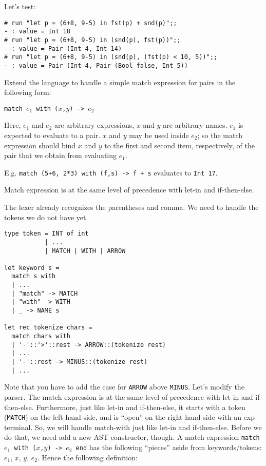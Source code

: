 \documentclass[addpoints]{exam}
\begin{document}
\begin{questions}
\begin{solution}
    
    Let's test:
    \begin{verbatim}
# run "let p = (6+8, 9-5) in fst(p) + snd(p)";;
- : value = Int 18
# run "let p = (6+8, 9-5) in (snd(p), fst(p))";;
- : value = Pair (Int 4, Int 14)
# run "let p = (6+8, 9-5) in (snd(p), (fst(p) < 10, 5))";;
- : value = Pair (Int 4, Pair (Bool false, Int 5))
    \end{verbatim}
  \end{solution}

  
  \question
  Extend the language to handle
  a simple match expression for pairs in the following form:

  \texttt{match $e_1$ with ($x$,$y$) -> $e_2$}

  Here, $e_1$ and $e_2$ are arbitrary expressions,
  $x$ and $y$ are arbitrary names.
  $e_1$ is expected to evaluate to a pair.
  $x$ and $y$ may be used
  inside $e_2$; so the match expression should bind
  $x$ and $y$ to the first and second item, respectively,
  of the pair that we obtain from evaluating $e_1$.

  E.g. \texttt{match (5+6, 2*3) with (f,s) -> f + s}
  evaluates to \texttt{Int 17}.

  Match expression is at the same level of precedence with let-in
  and if-then-else.
  
  \begin{solution}
    The lexer already recognizes the parentheses and comma.
    We need to handle the tokens we do not have yet.

    \begin{verbatim}
type token = INT of int
           | ...
           | MATCH | WITH | ARROW

let keyword s =
  match s with
  | ...
  | "match" -> MATCH
  | "with" -> WITH
  | _ -> NAME s
  
let rec tokenize chars =
  match chars with
  | '-'::'>'::rest -> ARROW::(tokenize rest)
  | ...
  | '-'::rest -> MINUS::(tokenize rest)
  | ...
    \end{verbatim}

    Note that you have to add the case for \texttt{ARROW} above \texttt{MINUS}.
    Let's modify the parser.
    The match expression is at the same level of precedence with let-in and if-then-else.
    Furthermore, just like let-in and if-then-else, it starts with a token
    (\texttt{MATCH}) on the left-hand-side,
    and is ``open'' on the right-hand-side with an exp terminal.
    So, we will handle match-with just like let-in and if-then-else.
    Before we do that, we need add a new AST constructor, though.
    A match expression \texttt{match $e_1$ with ($x$,$y$) -> $e_2$ end}
    has the following ``pieces'' aside from keywords/tokens: $e_1$, $x$, $y$, $e_2$.
    Hence the following definition:


\end{solution}
\end{questions}
\end{document}
